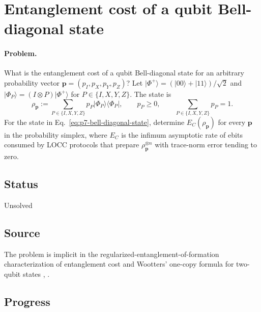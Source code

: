 \section{Entanglement cost of a qubit Bell-diagonal state}
\label{sec:problem-7}

\paragraph{Problem.}
What is the entanglement cost of a qubit Bell-diagonal state for an arbitrary
probability vector $\mathbf p=(p_I,p_X,p_Y,p_Z)$?  Let
$\lvert\Phi^+\rangle=(\lvert00\rangle+\lvert11\rangle)/\sqrt2$ and
$\lvert\Phi_P\rangle=(I\otimes P)\lvert\Phi^+\rangle$ for
$P\in\{I,X,Y,Z\}$.  The state is
\begin{equation}
  \rho_{\mathbf p}
  :=\sum_{P\in\{I,X,Y,Z\}}p_P
      \lvert\Phi_P\rangle\!\langle\Phi_P\rvert,
  \qquad p_P\geq0,
  \qquad \sum_{P\in\{I,X,Y,Z\}}p_P=1.
  \label{eq:p7-bell-diagonal-state}
\end{equation}
For the state in Eq.~\eqref{eq:p7-bell-diagonal-state}, determine
$E_C(\rho_{\mathbf p})$ for every $\mathbf p$ in the probability simplex,
where $E_C$ is the infimum asymptotic rate of ebits consumed by LOCC protocols
that prepare $\rho_{\mathbf p}^{\otimes n}$ with trace-norm error tending to
zero.

\subsection*{Status}

Unsolved

\subsection*{Source}

The problem is implicit in the regularized-entanglement-of-formation
characterization of entanglement cost and Wootters' one-copy formula for
two-qubit states ,
.

\subsection*{Progress}

